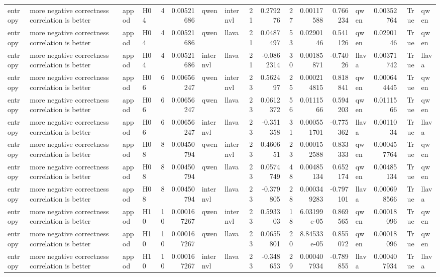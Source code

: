 \begin{longtable}{llllrrllrrrrrlrrl}
entropy & more negative correctness correlation is better & appod & H04 & 4 & 0.00521686 & qwen & internvl & 21 & 0.279276 & 27 & 0.00117588 & 0.766234 & qwen & 0.00352764 & True & qwen \\
entropy & more negative correctness correlation is better & appod & H04 & 4 & 0.00521686 & qwen & llava & 21 & 0.0487497 & 53 & 0.0290146 & 0.541126 & qwen & 0.0290146 & True & qwen \\
entropy & more negative correctness correlation is better & appod & H04 & 4 & 0.00521686 & internvl & llava & 21 & -0.0862314 & 30 & 0.00185871 & -0.74026 & llava & 0.00371742 & True & llava \\
entropy & more negative correctness correlation is better & appod & H06 & 6 & 0.00656247 & qwen & internvl & 23 & 0.562497 & 25 & 0.000214815 & 0.818841 & qwen & 0.000644445 & True & qwen \\
entropy & more negative correctness correlation is better & appod & H06 & 6 & 0.00656247 & qwen & llava & 23 & 0.0612372 & 56 & 0.0111566 & 0.594203 & qwen & 0.0111566 & True & qwen \\
entropy & more negative correctness correlation is better & appod & H06 & 6 & 0.00656247 & internvl & llava & 23 & -0.351358 & 31 & 0.000551701 & -0.775362 & llava & 0.0011034 & True & llava \\
entropy & more negative correctness correlation is better & appod & H08 & 8 & 0.00450794 & qwen & internvl & 23 & 0.460651 & 23 & 0.000152588 & 0.833333 & qwen & 0.000457764 & True & qwen \\
entropy & more negative correctness correlation is better & appod & H08 & 8 & 0.00450794 & qwen & llava & 23 & 0.0574749 & 48 & 0.00485134 & 0.652174 & qwen & 0.00485134 & True & qwen \\
entropy & more negative correctness correlation is better & appod & H08 & 8 & 0.00450794 & internvl & llava & 23 & -0.379805 & 28 & 0.000349283 & -0.797101 & llava & 0.000698566 & True & llava \\
entropy & more negative correctness correlation is better & appod & H10 & 10 & 0.000167267 & qwen & internvl & 23 & 0.593303 & 18 & 6.03199e-05 & 0.869565 & qwen & 0.00018096 & True & qwen \\
entropy & more negative correctness correlation is better & appod & H10 & 10 & 0.000167267 & qwen & llava & 23 & 0.0655801 & 20 & 8.84533e-05 & 0.855072 & qwen & 0.00018096 & True & qwen \\
entropy & more negative correctness correlation is better & appod & H10 & 10 & 0.000167267 & internvl & llava & 23 & -0.348653 & 29 & 0.000407934 & -0.789855 & llava & 0.000407934 & True & llava \\

\end{longtable}
